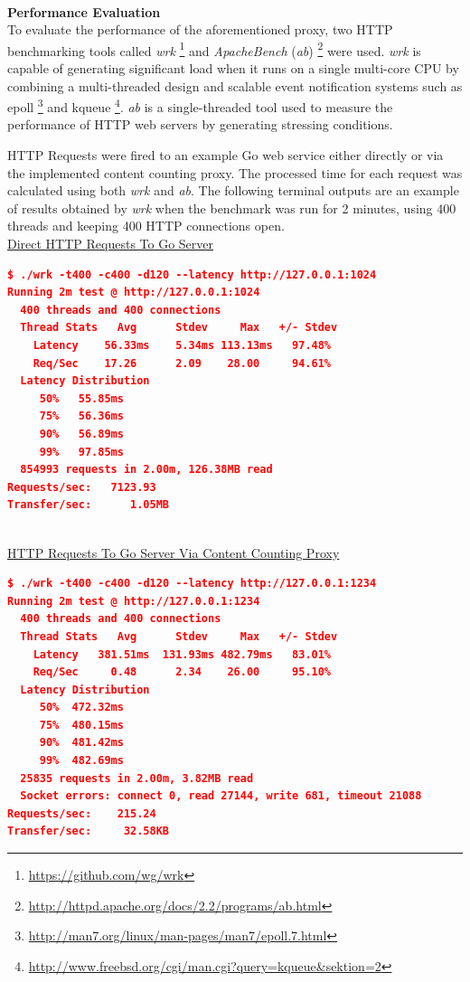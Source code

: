 \documentclass[a4paper,11pt,twoside]{article}
\begin{document}
\noindent\\
\textbf{Performance Evaluation}\\
To evaluate the performance of the aforementioned proxy, two HTTP benchmarking tools called \textit{wrk} \footnote{\label{wrk} \url{https://github.com/wg/wrk}} and \textit{ApacheBench} (\textit{ab}) \footnote{\label{ab} \url{http://httpd.apache.org/docs/2.2/programs/ab.html}}  were used. \textit{wrk} is capable of generating significant load when it runs on a single multi-core CPU by combining a multi-threaded design and scalable event notification systems such as epoll \footnote{\label{epoll} \url{http://man7.org/linux/man-pages/man7/epoll.7.html}} and kqueue \footnote{\label{wrk} \url{http://www.freebsd.org/cgi/man.cgi?query=kqueue&sektion=2}}. \textit{ab} is a single-threaded tool used to measure the performance of HTTP web servers by generating stressing conditions.



HTTP Requests were fired to an example Go web service either directly or via the implemented content counting proxy. The processed time for each request was calculated using both \textit{wrk} and \textit{ab}. The following terminal outputs are an example of results obtained by \textit{wrk} when the benchmark was run for 2 minutes, using 400 threads and keeping 400 HTTP connections open.  \\  

\noindent
\underline{Direct HTTP Requests To Go Server}
\begin{lstlisting}[language=json,firstnumber=1]
$ ./wrk -t400 -c400 -d120 --latency http://127.0.0.1:1024
Running 2m test @ http://127.0.0.1:1024
  400 threads and 400 connections
  Thread Stats   Avg      Stdev     Max   +/- Stdev
    Latency    56.33ms    5.34ms 113.13ms   97.48%
    Req/Sec    17.26      2.09    28.00     94.61%
  Latency Distribution
     50%   55.85ms
     75%   56.36ms
     90%   56.89ms
     99%   97.85ms
  854993 requests in 2.00m, 126.38MB read
Requests/sec:   7123.93
Transfer/sec:      1.05MB
\end{lstlisting}

\noindent\\
\underline{HTTP Requests To Go Server Via Content Counting Proxy} 
\begin{lstlisting}[language=json,firstnumber=1]
$ ./wrk -t400 -c400 -d120 --latency http://127.0.0.1:1234
Running 2m test @ http://127.0.0.1:1234
  400 threads and 400 connections
  Thread Stats   Avg      Stdev     Max   +/- Stdev
    Latency   381.51ms  131.93ms 482.79ms   83.01%
    Req/Sec     0.48      2.34    26.00     95.10%
  Latency Distribution
     50%  472.32ms
     75%  480.15ms
     90%  481.42ms
     99%  482.69ms
  25835 requests in 2.00m, 3.82MB read
  Socket errors: connect 0, read 27144, write 681, timeout 21088
Requests/sec:    215.24
Transfer/sec:     32.58KB
\end{lstlisting}
\end{document}
